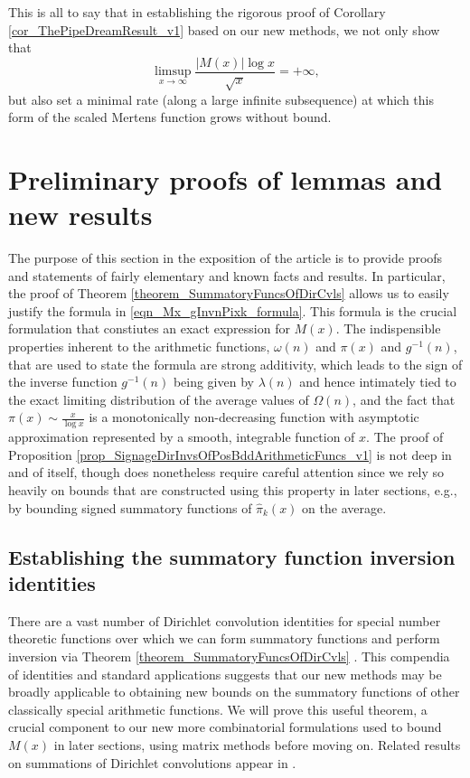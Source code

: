 \documentclass[11pt,reqno,a4letter]{article}
\numberwithin{figure}{section}
\numberwithin{table}{section}
\newcommand{\cf}{\textit{cf.\ }}
\theoremstyle{plain}
\numberwithin{theorem}{section}
\theoremstyle{definition}
\begin{document}
This is all to say that in establishing the rigorous proof of 
Corollary \ref{cor_ThePipeDreamResult_v1} 
based on our new methods, we not only show that 
\[
\limsup_{x \rightarrow \infty} \frac{|M(x)| \log x}{\sqrt{x}} = +\infty, 
\]
but also set a minimal rate (along a large infinite subsequence) at which this form of the 
scaled Mertens function grows without bound. 

\newpage 
\section{Preliminary proofs of lemmas and new results} 
\label{Section_PrelimProofs_Config} 

The purpose of this section in the exposition of the article is to provide proofs and statements 
of fairly elementary and known facts and results. In particular, the proof of 
Theorem \ref{theorem_SummatoryFuncsOfDirCvls} allows us to easily justify the formula in 
\eqref{eqn_Mx_gInvnPixk_formula}. 
This formula is the crucial formulation that constiutes an exact expression for $M(x)$. 
The indispensible properties inherent to the arithmetic functions, $\omega(n)$ and $\pi(x)$ and $g^{-1}(n)$, 
that are used to state the formula are strong additivity, which leads to the sign of the inverse function 
$g^{-1}(n)$ being given by $\lambda(n)$ and hence intimately tied to the exact limiting 
distribution of the average values of $\Omega(n)$, and the fact that $\pi(x) \sim \frac{x}{\log x}$ 
is a monotonically non-decreasing function with asymptotic approximation represented by a smooth, integrable 
function of $x$. 
The proof of Proposition \ref{prop_SignageDirInvsOfPosBddArithmeticFuncs_v1} 
is not deep in and of itself, though does nonetheless require careful attention since we rely so 
heavily on bounds that are constructed using this property in later sections, e.g., by bounding 
signed summatory functions of $\widehat{\pi}_k(x)$ on the average. 

\subsection{Establishing the summatory function inversion identities} 

There are a vast number of Dirichlet convolution 
identities for special number theoretic functions over which 
we can form summatory functions and perform inversion via 
Theorem \ref{theorem_SummatoryFuncsOfDirCvls} \cite{CATALOG-INTDIRSERIES,CATALOG-LAMBERTSERIES}. 
This compendia of identities and standard applications suggests that our new methods may be 
broadly applicable to obtaining new bounds on the summatory functions of other classically special 
arithmetic functions. 
We will prove this useful theorem, a crucial component to our new more combinatorial 
formulations used to bound $M(x)$ in later sections, using matrix methods before moving on. 
Related results on summations of Dirichlet convolutions appear in 
\cite[\S 2.14; \S 3.10; \S 3.12; \cf \S 4.9, p.\ 95]{APOSTOLANUMT}. 
\end{document}
